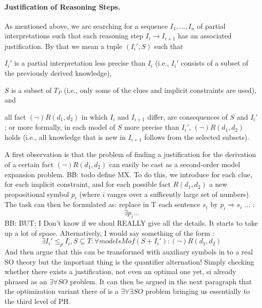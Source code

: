 \documentclass{ecai}
\newcommand\m[1]{\ensuremath{#1}\xspace}
\newcommand\leqp{\m{\leq_p}}
\newcommand\bart[1]{{\color{red}\textsc{BB}: #1}}
\begin{document}
\paragraph{Justification of Reasoning Steps.}
As mentioned above, we are searching for a sequence $I_1,\dots, I_n$ of partial interpretations such that each reasoning step $I_i\to I_{i+1}$ has an associated justification. By that we mean a tuple $(I_i',S)$ such that  
\begin{compactitem}
 \item $I_i'$ is a partial interpretation less precise than $I_i$ (i.e., $I_i'$ consists of a subset of the previously derived knowledge), 
 \item $S$ is a subset of $T_P$ (i.e., only some of the clues and implicit constraints are used), and 
 \item all fact $(\lnot) R(d_1,d_2)$ in which $I_i$ and $I_{i+1}$ differ, are consequences of $S$ and $I_i'$; or more formally, in each model of $S$ more precise than $I_i'$, $(\lnot) R(d_1,d_2)$ holds (i.e., all knowledge that is new in $I_{i+1}$ follows from the selected subsets).
\end{compactitem}
A first observation is that the problem of finding a justification for the derivation of a certain fact $(\lnot) R(d_1,d_2)$ can easily be cast as a second-order model expansion problem. \bart{todo define MX}. 
To do this, we introduce for each clue, for each implicit constraint, and for each possible fact $R(d_1,d_2)$ a new propositional symbol $p_i$ (where $i$ ranges over a sufficently large set of numbers). 
The task can then be formulated as: replace in T each sentence $s_i$ by $p_i\Rightarrow s_i$ ... : 
\[\exists p_i... \]
\bart{BUT; I Don't know if we shoul REALLY give all the details. It starts to take up a lot of space. Alternatively, I would say something of the form : 
\[\exists I_i'\leqp I_i, S\subseteq T: \forall models M of (S+I_i'): (\lnot) R(d_1,d_2) \]
And then argue that this can be transformed with auxiliary symbols in to a real SO theory but the important thing is the quantifier alternation! Simply checking whether there exists a justification, not even an optimal one yet, si already phrased as an $\exists\forall SO$ problem. It can then be argued in the next paragraph that the optimization variant there of is a $\exists\forall\exists SO$ problem bringing us essentially to the third level of PH. 
}
\end{document}
